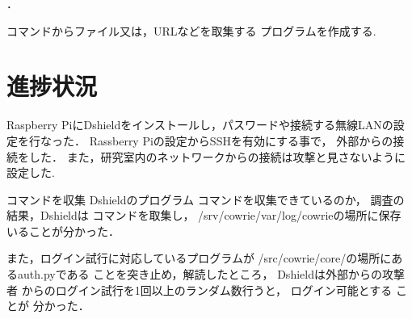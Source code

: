 \documentclass{entry}
\begin{document}
．

コマンドからファイル又は，URLなどを取集する
プログラムを作成する.


\section{進捗状況}

Raspberry PiにDshieldをインストールし，パスワードや接続する無線LANの設定を行なった．
Rassberry Piの設定からSSHを有効にする事で，
外部からの接続をした．
また，研究室内のネットワークからの接続は攻撃と見さないように設定した.


コマンドを収集
Dshieldのプログラム
コマンドを収集できているのか，
調査の結果，Dshieldは
コマンドを取集し，
/srv/cowrie/var/log/cowrieの場所に保存
いることが分かった．

また，ログイン試行に対応しているプログラムが
/src/cowrie/core/の場所にあるauth.pyである
ことを突き止め，解読したところ，
Dshieldは外部からの攻撃者
からのログイン試行を1回以上のランダム数行うと，
ログイン可能とする
ことが
分かった．
\end{document}
